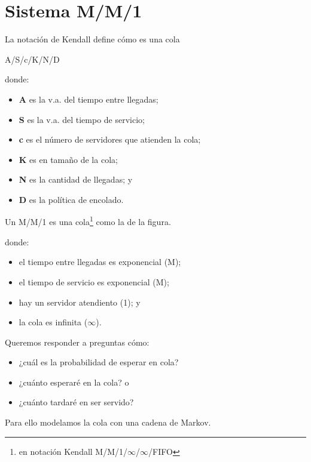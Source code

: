 \documentclass{beamer}
\begin{document}
\section{Sistema M/M/1}

\begin{frame}{\secname}
    La notación de Kendall define cómo es 
    una cola
    \begin{center}
        A/S/c/K/N/D 
    \end{center}
    donde:
    \begin{itemize}
        \item \textbf{A} es la v.a. del tiempo
            entre llegadas;
        \item \textbf{S} es la v.a. del tiempo
            de servicio;
        \item \textbf{c} es el número de
            servidores que atienden la cola;
        \item \textbf{K} es en tamaño de la cola;
        \item \textbf{N} es la cantidad de
            llegadas; y
        \item \textbf{D} es la política de
            encolado.
    \end{itemize}
\end{frame}




\begin{frame}{\secname}
    Un M/M/1 es una cola\footnote{en notación
    Kendall M/M/1/$\infty$/$\infty$/FIFO}
    como la de la figura.

    \begin{figure}
        
    \end{figure}

    donde:
    \begin{itemize}
        \item el tiempo entre llegadas es
            exponencial (M);
        \item el tiempo de servicio es
            exponencial (M);
        \item hay un servidor atendiento (1); y
        \item la cola es infinita ($\infty$).
    \end{itemize}

\end{frame}




\begin{frame}{\secname}
    Queremos responder a preguntas cómo:
    \begin{itemize}
        \item ¿cuál es la probabilidad
            de esperar en cola?
        \item ¿cuánto esperaré en la cola? o
        \item ¿cuánto tardaré en ser servido?
    \end{itemize}

    \vfill

    Para ello modelamos la cola con una
    cadena de Markov.
\end{frame}
\end{document}
